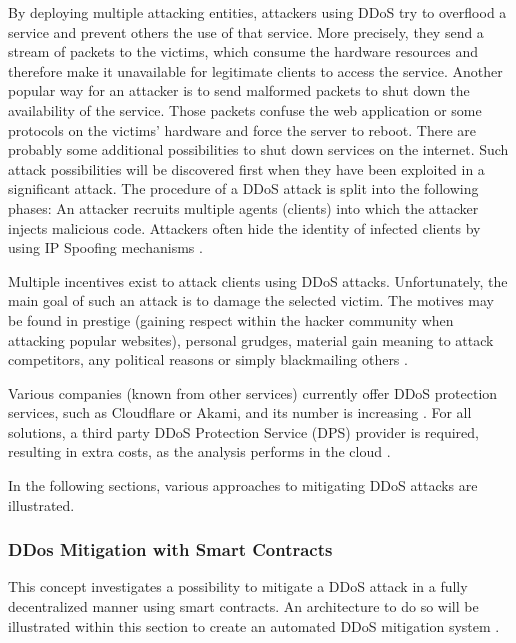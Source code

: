 By deploying multiple attacking entities, attackers using DDoS try to overflood a service and prevent others the use of that service. More precisely, they send a stream of packets to the victims, which consume the hardware resources and therefore make it unavailable for legitimate clients to access the service. Another popular way for an attacker is to send malformed packets to shut down the availability of the service. Those packets confuse the web application or some protocols on the victims' hardware and force the server to reboot. There are probably some additional possibilities to shut down services on the internet. Such attack possibilities will be discovered first when they have been exploited in a significant attack. The procedure of a DDoS attack is split into the following phases: An attacker recruits multiple agents (clients) into which the attacker injects malicious code. Attackers often hide the identity of infected clients by using IP Spoofing mechanisms \cite{Mirkovic2004}.


Multiple incentives exist to attack clients using DDoS attacks. Unfortunately, the main goal of such an attack is to damage the selected victim. The motives may be found in prestige (gaining respect within the hacker community when attacking popular websites), personal grudges, material gain meaning to attack competitors, any political reasons or simply blackmailing others \cite{Mirkovic2004}.


Various companies (known from other services) currently offer DDoS protection services, such as Cloudflare or Akami, and its number is increasing \cite{Pras2016}. For all solutions, a third party DDoS Protection Service (DPS) provider is required, resulting in extra costs, as the analysis performs in the cloud \cite{Rodrigues2017}.


In the following sections, various approaches to mitigating DDoS attacks are illustrated.


\subsubsection{DDos Mitigation with Smart Contracts}
This concept investigates a possibility to mitigate a DDoS attack in a fully decentralized manner using smart contracts. An architecture to do so will be illustrated within this section to create an automated DDoS mitigation system \cite{Rodrigues2017}.

